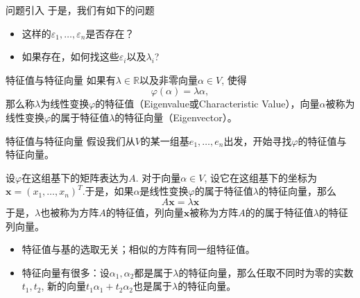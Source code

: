 \documentclass[10pt]{beamer}
\begin{document}

\begin{frame}

\begin{block}{问题引入}
\vspace{1em}
于是，我们有如下的问题
\vspace{2em}
\begin{itemize}
\item<2-> 这样的$\varepsilon_1,\ldots,\varepsilon_n$是否存在？
\vspace{1em}
\item<3-> 如果存在，如何找这些$\varepsilon_i$以及$\lambda_i$?
\end{itemize}
\end{block}

\end{frame}


\begin{frame}

\begin{block}{特征值与特征向量}
如果有$\lambda \in \mathbb{R}$以及{\color{red}非零向量}$\alpha \in V$, 使得
$$\varphi(\alpha) = \lambda \alpha,$$
那么称$\lambda$为线性变换$\varphi$的特征值（Eigenvalue或Characteristic Value），向量$\alpha$被称为线性变换$\varphi$的属于特征值$\lambda$的特征向量（Eigenvector）。
\end{block}

\end{frame}


\begin{frame}

\begin{block}{特征值与特征向量}
假设我们从$V$的某一组基$e_1, \ldots, e_n$出发，开始寻找$\varphi$的特征值与特征向量。

\vspace{1em}
\pause

设$\varphi$在这组基下的矩阵表达为$A$. 对于向量$\alpha \in V$, 设它在这组基下的坐标为$\mathbf{x} = (x_1,\ldots,x_n)^T$.于是，如果$\alpha$是线性变换$\varphi$的属于特征值$\lambda$的特征向量，那么
$$A\mathbf{x} = \lambda\mathbf{x}$$
于是，$\lambda$也被称为方阵$A$的特征值，列向量$\mathbf{x}$被称为方阵$A$的的属于特征值$\lambda$的特征列向量。


\vspace{1em}
\pause
\begin{itemize}
\item 特征值与基的选取无关；相似的方阵有同一组特征值。
\item 特征向量有很多：设$\alpha_1,\alpha_2$都是属于$\lambda$的特征向量，那么任取不同时为零的实数$t_1,t_2$, 新的向量$t_1\alpha_1+t_2\alpha_2$也是属于$\lambda$的特征向量。
\end{itemize}
\end{block}

\end{frame}
\end{document}
